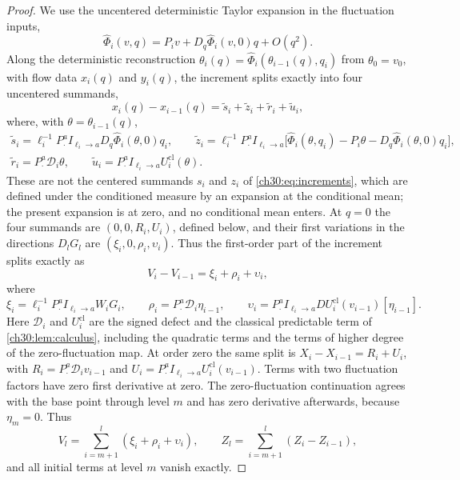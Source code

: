 \begin{proof}
We use the uncentered deterministic Taylor expansion in the fluctuation inputs,
\[
 \widehat\Phi_i(v,q)=P_iv+D_q\widehat\Phi_i(v,0)q+O(q^2).
\]
Along the deterministic reconstruction $\theta_i(q)=\widehat\Phi_i(\theta_{i-1}(q),q_i)$ from $\theta_0=v_0$, with flow data $x_i(q)$ and $y_i(q)$, the increment splits exactly into four uncentered summands,
\[
 x_i(q)-x_{i-1}(q)=\tilde s_i+\tilde z_i+\tilde r_i+\tilde u_i,
\]
where, with $\theta=\theta_{i-1}(q)$,
\[
 \begin{gathered}
 \tilde s_i=\ell_i^{-1}P_\cdot^aI_{\ell_i\to a}D_q\widehat\Phi_i(\theta,0)q_i,\qquad
 \tilde z_i=\ell_i^{-1}P_\cdot^aI_{\ell_i\to a}\bigl[\widehat\Phi_i(\theta,q_i)-P_i\theta-D_q\widehat\Phi_i(\theta,0)q_i\bigr],\\
 \tilde r_i=P_\cdot^a\mathscr D_i\theta,\qquad\tilde u_i=P_\cdot^aI_{\ell_i\to a}U_i^{\mathrm{cl}}(\theta).
 \end{gathered}
\]
These are not the centered summands $s_i$ and $z_i$ of \eqref{ch30:eq:increments}, which are defined under the conditioned measure by an expansion at the conditional mean; the present expansion is at zero, and no conditional mean enters. At $q=0$ the four summands are $(0,0,R_i,U_i)$, defined below, and their first variations in the directions $D_lG_l$ are $(\xi_i,0,\rho_i,\upsilon_i)$. Thus the first-order part of the increment splits exactly as
\begin{equation}\label{ch30:eq:linear-adjacent}
 V_i-V_{i-1}=\xi_i+\rho_i+\upsilon_i,
\end{equation}
where
\[
 \xi_i=\ell_i^{-1}P_\cdot^aI_{\ell_i\to a}W_iG_i,\qquad\rho_i=P_\cdot^a\mathscr D_i\eta_{i-1},\qquad\upsilon_i=P_\cdot^aI_{\ell_i\to a}DU_i^{\mathrm{cl}}(v_{i-1})[\eta_{i-1}].
\]
Here $\mathscr D_i$ and $U_i^{\mathrm{cl}}$ are the signed defect and the classical predictable term of \cref{ch30:lem:calculus}, including the quadratic terms and the terms of higher degree of the zero-fluctuation map. At order zero the same split is $X_i-X_{i-1}=R_i+U_i$, with $R_i=P_\cdot^a\mathscr D_iv_{i-1}$ and $U_i=P_\cdot^aI_{\ell_i\to a}U_i^{\mathrm{cl}}(v_{i-1})$. Terms with two fluctuation factors have zero first derivative at zero. The zero-fluctuation continuation agrees with the base point through level $m$ and has zero derivative afterwards, because $\eta_m=0$. Thus
\[
 V_l=\sum_{i=m+1}^l(\xi_i+\rho_i+\upsilon_i),\qquad Z_l=\sum_{i=m+1}^l(Z_i-Z_{i-1}),
\]
and all initial terms at level $m$ vanish exactly.


\end{proof}
